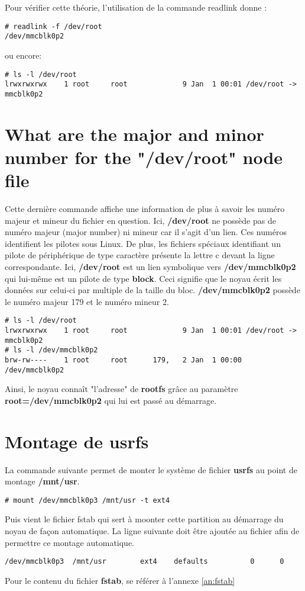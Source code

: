Pour vérifier cette théorie, l'utilisation de la commande readlink donne :
\begin{lstlisting}
# readlink -f /dev/root
/dev/mmcblk0p2
\end{lstlisting}
ou encore:
\begin{lstlisting}
# ls -l /dev/root
lrwxrwxrwx    1 root     root             9 Jan  1 00:01 /dev/root -> mmcblk0p2
\end{lstlisting}

\section{What are the major and minor number for the "/dev/root" node file}
Cette dernière commande affiche une information de plus à savoir les numéro majeur et mineur du fichier en question. Ici, \textbf{/dev/root} ne possède pas de numéro majeur (major number) ni mineur car il s'agit d'un lien. Ces numéros identifient les pilotes sous Linux. De plus, les fichiers spéciaux identifiant un pilote de périphérique de type caractère présente la lettre c devant la ligne correspondante. Ici, \textbf{/dev/root} est un lien symbolique vers \textbf{/dev/mmcblk0p2} qui lui-même est un pilote de type \textbf{block}. Ceci signifie que le noyau écrit les données sur celui-ci par multiple de la taille du bloc. \textbf{/dev/mmcblk0p2} possède le numéro majeur 179 et le numéro mineur 2.
\begin{lstlisting}[style=Bash]
# ls -l /dev/root
lrwxrwxrwx    1 root     root             9 Jan  1 00:01 /dev/root -> mmcblk0p2
# ls -l /dev/mmcblk0p2
brw-rw----    1 root     root      179,   2 Jan  1 00:00 /dev/mmcblk0p2
\end{lstlisting}

Ainsi, le noyau connaît "l'adresse" de \textbf{rootfs} grâce au paramètre \textbf{root=/dev/mmcblk0p2} qui lui est passé au démarrage.

\section{Montage de usrfs}
La commande suivante permet de monter le système de fichier \textbf{usrfs} au point de montage \textbf{/mnt/usr}.
\begin{lstlisting}[style=Bash]
# mount /dev/mmcblk0p3 /mnt/usr -t ext4
\end{lstlisting}
Puis vient le fichier fstab qui sert à moonter cette partition au démarrage du noyau de façon automatique. La ligne suivante doit être ajoutée au fichier afin de permettre ce montage automatique.
\begin{lstlisting}
/dev/mmcblk0p3  /mnt/usr        ext4    defaults          0      0
\end{lstlisting}
Pour le contenu du fichier \textbf{fstab}, se référer à l'annexe \ref{an:fstab}
